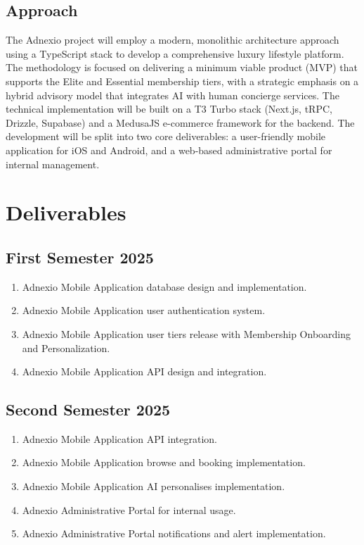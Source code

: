 \subsection{Approach}
The Adnexio project will employ a modern, monolithic architecture approach using a TypeScript stack to develop a comprehensive luxury lifestyle platform. The methodology is focused on delivering a minimum viable product (MVP) that supports the Elite and Essential membership tiers, with a strategic emphasis on a hybrid advisory model that integrates AI with human concierge services. The technical implementation will be built on a T3 Turbo stack (Next.js, tRPC, Drizzle, Supabase) and a MedusaJS e-commerce framework for the backend. The development will be split into two core deliverables: a user-friendly mobile application for iOS and Android, and a web-based administrative portal for internal management.

\section{Deliverables}
\subsection{First Semester 2025}
\begin{enumerate}
    \item Adnexio Mobile Application database design and implementation.
    \item Adnexio Mobile Application user authentication system.
    \item Adnexio Mobile Application user tiers release with Membership Onboarding and Personalization.
    \item Adnexio Mobile Application API design and integration.
\end{enumerate}
\subsection{Second Semester 2025}
\begin{enumerate}
    \item Adnexio Mobile Application API integration.
    \item Adnexio Mobile Application browse and booking implementation.
    \item Adnexio Mobile Application AI personalises implementation.
    \item Adnexio Administrative Portal for internal usage.
    \item Adnexio Administrative Portal notifications and alert implementation.
\end{enumerate}


